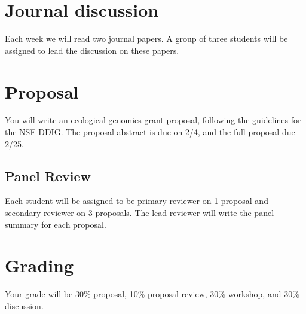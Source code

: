 \documentclass[]{article}
\begin{document}
\section*{Journal discussion}
Each week we will read two journal papers. A group of three students will be assigned to lead the discussion on these papers.

\section*{Proposal}
You will write an ecological genomics grant proposal, following the guidelines for the NSF DDIG.  The proposal abstract is due on 2/4, and the full proposal due 2/25. \\

\subsection*{Panel Review}
Each student will be assigned to be primary reviewer on 1 proposal and secondary reviewer on 3 proposals. The lead reviewer will write the panel summary for each proposal.

\section*{Grading}
Your grade will be 30\% proposal, 10\% proposal review, 30\% workshop, and 30\% discussion.
\end{document}
